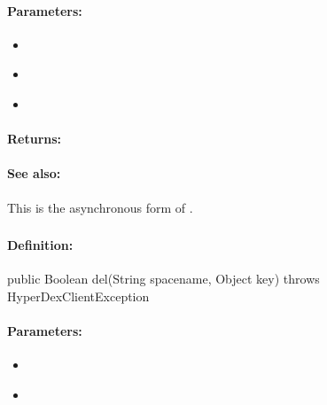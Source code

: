 \paragraph{Parameters:}
\begin{itemize}[noitemsep]
\item {}\\

\item {}\\

\item {}\\

\end{itemize}

\paragraph{Returns:}


\paragraph{See also:}  This is the asynchronous form of .

\pagebreak
\subsubsection{}
\label{api:java:del}


\paragraph{Definition:}
\begin{javacode}
public Boolean del(String spacename, Object key) throws HyperDexClientException
\end{javacode}

\paragraph{Parameters:}
\begin{itemize}[noitemsep]
\item {}\\

\item {}\\

\end{itemize}

